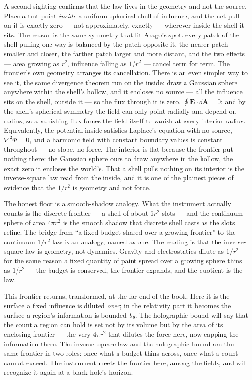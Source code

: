 A second sighting confirms that the law lives in the geometry and not the source. Place a test point
\emph{inside} a uniform spherical shell of influence, and the net pull on it is exactly zero --- not
approximately, exactly --- wherever inside the shell it sits. The reason is the same symmetry that lit Arago's
spot: every patch of the shell pulling one way is balanced by the patch opposite it, the nearer patch smaller
and closer, the farther patch larger and more distant, and the two effects --- area growing as $r^2$,
influence falling as $1/r^2$ --- cancel term for term. The frontier's own geometry arranges its cancellation.
There is an even simpler way to see it, the same divergence theorem run on the inside: draw a Gaussian sphere
anywhere within the shell's hollow, and it encloses no source --- all the influence sits on the shell, outside
it --- so the flux through it is zero, $\oint \mathbf{E}\cdot d\mathbf{A} = 0$; and by the shell's spherical
symmetry the field can only point radially and depend on radius, so a vanishing flux forces the field itself to
vanish at every interior radius. Equivalently, the potential inside satisfies Laplace's equation with no
source, $\nabla^2\Phi = 0$, and a harmonic field with constant boundary values is constant throughout --- no
slope, no force. The interior is flat because the frontier put nothing there: the Gaussian sphere ours to draw anywhere in
the hollow, the exact zero it encloses the world's.
That a shell pulls nothing on its interior is the inverse-square law read from the inside, and it is one of
the plainest pieces of evidence that the $1/r^2$ is geometry and not force.

The honest floor is a smooth-shadow analogy. What the instrument actually counts is the discrete frontier ---
a shell of about $6r^2$ slots --- and the continuum sphere of area $4\pi r^2$ is the smooth shadow that
discrete shell casts as the slots refine. The bridge from ``a fixed budget shared over a growing frontier'' to
the continuum $1/r^2$ law is an analogy, named as one. The reading is that the inverse-square law is geometry,
not dynamics. Gravity and electrostatics dilute as $1/r^2$ for the same reason a fixed quantity of paint
spread over a growing sphere thins as $1/r^2$ --- the budget is conserved, the frontier expands, and the
quotient is the law.

This frontier returns, transformed, at the far end of the book. Here it is the surface a fixed influence is
diluted \emph{over}; in the relativity part it becomes the surface a region's information is bounded \emph{by}.
The holographic bound will say that the count a region can hold is set not by its volume but by the area of
its enclosing frontier --- the very $4\pi r^2$ that dilutes the force here, now capping the information there.
The inverse-square law and the holographic bound are the same frontier in two roles: once what a budget
thins across, once what a count cannot exceed. The instrument meets the frontier here, among the fields,
and will recognize it again at a black hole's horizon.

